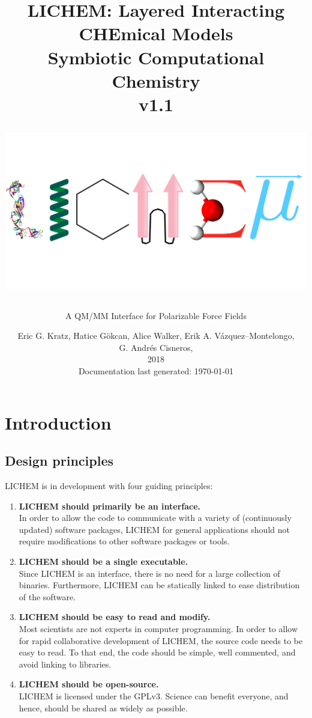 \documentclass[12pt]{report}
\title{{\color{blue}LICHEM:} {\color{red}L}ayered {\color{red}I}nteracting
{\color{red}CHE}mical {\color{red}M}odels \\
Symbiotic Computational Chemistry \\
v1.1
\\ \vspace{2cm}
\begin{center}
\centering\includegraphics[width=\textwidth]{../doc/images/LICHEM_logo.png}
\end{center}}
\author{A QM/MM Interface for Polarizable Force Fields}
\date{Eric G. Kratz, Hatice G\"{o}kcan, Alice Walker,
Erik A. V\'azquez--Montelongo, \\
G. Andr\'{e}s Cisneros, \\
2018\\
\small{\vspace{0.1in}Documentation last generated: \today}
}
\begin{document}
\maketitle

\hypertarget{toc}{}
\bookmark[level=chapter,dest=toc]{\contentsname}
\tableofcontents

\clearpage{}
\label{List of Figures}
\hypertarget{lof}{}
\bookmark[level=chapter,dest=lof]{\listfigurename}
\listoffigures
\newpage

\label{List of Tables}
\hypertarget{lot}{}
\bookmark[level=chapter,dest=lot]{\listtablename}
\listoftables
\newpage

\chapter{Introduction}

\section{Design principles}

LICHEM is in development with four guiding principles: \\
\begin{enumerate}
  \item \textbf{LICHEM should primarily be an interface.} \\
  In order to allow the code to communicate with a variety of (continuously
  updated) software packages, LICHEM for general applications
  should not require modifications to other
  software packages or tools.

  \item \textbf{LICHEM should be a single executable.} \\
  Since LICHEM is an interface, there is no need for a large collection of
  binaries.
  Furthermore, LICHEM can be statically linked to ease distribution of the
  software.

  \item \textbf{LICHEM should be easy to read and modify.} \\
  Most scientists are not experts in computer programming.
  In order to allow for rapid collaborative development of LICHEM, the source
  code needs to be easy to read.
  To that end, the code should be simple, well commented, and avoid linking to
  libraries.

  \item \textbf{LICHEM should be open-source.} \\
  LICHEM is licensed under the GPLv3.
  Science can benefit everyone, and hence, should be shared as widely as
  possible.
\end{enumerate}
\end{document}
